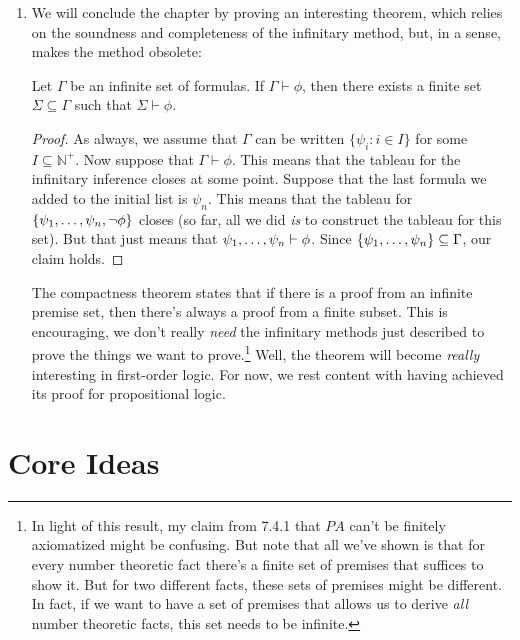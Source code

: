 \begin{enumerate}[\thesection.1]
			\item We will conclude the chapter by proving an interesting theorem, which relies on the soundness and completeness of the infinitary method, but, in a sense, makes the method obsolete:
	\begin{theorem}[Compactness]
	Let $\Gamma$ be an infinite set of formulas. If $\Gamma\vdash\phi$, then there exists a finite set $\Sigma\subseteq\Gamma$ such that $\Sigma\vdash\phi$. 
	\end{theorem}	
	\begin{proof}
	As always, we assume that $\Gamma$ can be written $\{\psi_i: i\in I\}$ for some $I\subseteq\mathbb{N}^+$. Now suppose that $\Gamma\vdash\phi$. This means that the tableau for the infinitary inference closes at some point. Suppose that the last formula we added to the initial list is $\psi_n$. This means that the tableau for $\{\psi_1, \mathellipsis, \psi_n,\neg\phi\}$ closes (so far, all we did \emph{is} to construct the tableau for this set). But that just means that $\psi_1, \mathellipsis,\psi_n\vdash\phi$. Since $\{\psi_1, \mathellipsis,\psi_n\}\subseteq\Gamma$, our claim holds.
	\end{proof}
	The compactness theorem states that if there is a proof from an infinite premise set, then there's always a proof from a finite subset. This is encouraging, we don't really \emph{need} the infinitary methods just described to prove the things we want to prove.\footnote{In light of this result, my claim from 7.4.1 that $PA$ can't be finitely axiomatized might be confusing. But note that all we've shown is that for every number theoretic fact there's a finite set of premises that suffices to show it. But for two different facts, these sets of premises might be different. In fact, if we want to have a set of premises that allows us to derive \emph{all} number theoretic facts, this set needs to be infinite.} Well, the theorem will become \emph{really} interesting in first-order logic. For now, we rest content with having achieved its proof for propositional logic.
			
	\end{enumerate}
					
\section{Core Ideas}

